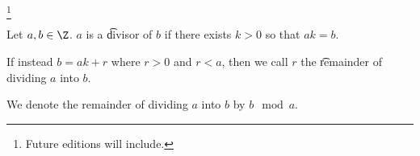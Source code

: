 
\footnote{Future editions will include.}


Let $a, b \in \Z$.
$a$ is a \t{divisor} of $b$ if there exists $k > 0$ so that $ak = b$.

If instead $b = ak + r$ where $r > 0$ and $r < a$, then we call $r$ the \t{remainder} of dividing $a$ into $b$.


We denote the remainder of dividing $a$ into $b$ by $b \mod a$.

\blankpage
